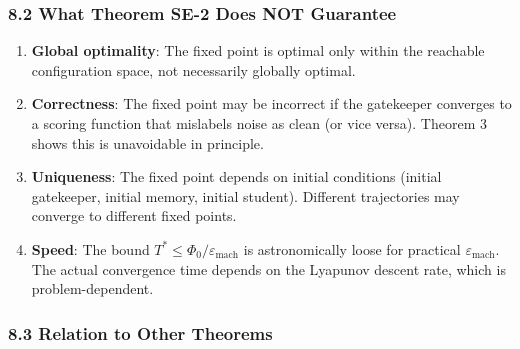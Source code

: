 \documentclass[
  12pt,
]{article}
\providecommand{\tightlist}{%
  \setlength{\itemsep}{0pt}\setlength{\parskip}{0pt}}
\begin{document}
\subsubsection{8.2 What Theorem SE-2 Does NOT
Guarantee}\label{what-theorem-se-2-does-not-guarantee}

\begin{enumerate}
\def\labelenumi{\arabic{enumi}.}
\tightlist
\item
  \textbf{Global optimality}: The fixed point is optimal only within the
  reachable configuration space, not necessarily globally optimal.
\item
  \textbf{Correctness}: The fixed point may be incorrect if the
  gatekeeper converges to a scoring function that mislabels noise as
  clean (or vice versa). Theorem 3 shows this is unavoidable in
  principle.
\item
  \textbf{Uniqueness}: The fixed point depends on initial conditions
  (initial gatekeeper, initial memory, initial student). Different
  trajectories may converge to different fixed points.
\item
  \textbf{Speed}: The bound
  \(T^* \leq \Phi_0/\varepsilon_{\text{mach}}\) is astronomically loose
  for practical \(\varepsilon_{\text{mach}}\). The actual convergence
  time depends on the Lyapunov descent rate, which is problem-dependent.
\end{enumerate}

\subsubsection{8.3 Relation to Other
Theorems}\label{relation-to-other-theorems}
\end{document}
